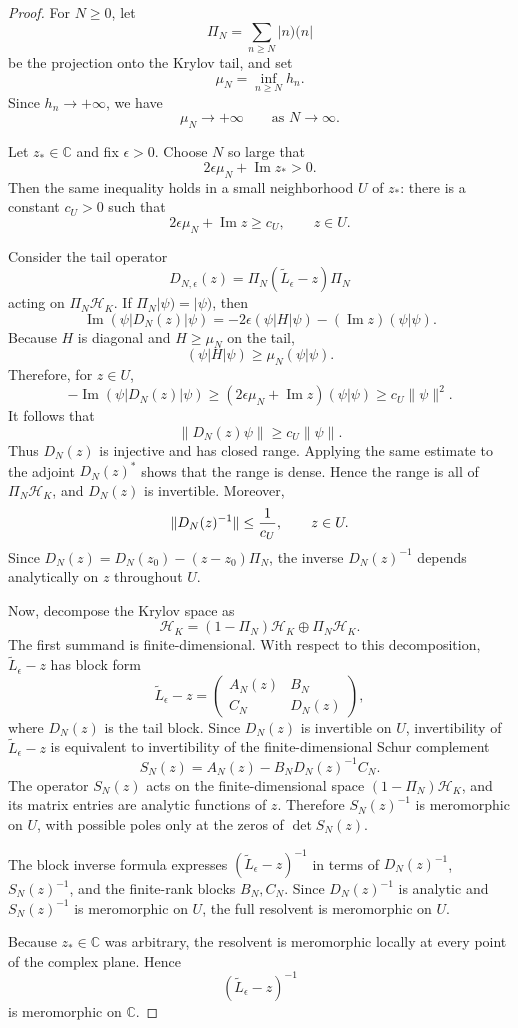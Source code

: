 \documentclass[JHEP,12pt]{article}
\begin{document}
\begin{proof}
For \(N\ge 0\), let
\[
\Pi_N=\sum_{n\ge N}|n)(n|
\]
be the projection onto the Krylov tail, and set
\[
\mu_N=\inf_{n\ge N}h_n .
\]
Since \(h_n\to+\infty\), we have
\[
\mu_N\longrightarrow+\infty
\qquad\text{as }N\to\infty .
\]

Let \(z_\ast\in\mathbb C\) and fix $\epsilon>0$. Choose \(N\) so large that
\[
2\epsilon\mu_N+\operatorname{Im}z_\ast>0 .
\]
Then the same inequality holds in a small neighborhood \(U\) of \(z_\ast\):
there is a constant \(c_U>0\) such that
\[
2\epsilon\mu_N+\operatorname{Im}z\ge c_U,
\qquad z\in U .
\]

Consider the tail operator
\[
D_{N,\epsilon}(z)=\Pi_N(\widetilde L_\epsilon-z)\Pi_N
\]
acting on \(\Pi_N\mathcal H_K\). If \(\Pi_N|\psi)=|\psi)\), then
\[
\operatorname{Im}(\psi|D_N(z)|\psi)
=
-2\epsilon(\psi|H|\psi)-(\operatorname{Im}z)(\psi|\psi).
\]
Because \(H\) is diagonal and \(H\ge \mu_N\) on the tail,
\[
(\psi|H|\psi)\ge \mu_N(\psi|\psi).
\]
Therefore, for \(z\in U\),
\[
-\operatorname{Im}(\psi|D_N(z)|\psi)
\ge
\left(2\epsilon\mu_N+\operatorname{Im}z\right)(\psi|\psi)
\ge
c_U\|\psi\|^2 .
\]
It follows that
\[
\|D_N(z)\psi\|\ge c_U\|\psi\| .
\]
Thus \(D_N(z)\) is injective and has closed range. Applying the same estimate to
the adjoint \(D_N(z)^*\) shows that the range is dense. Hence the range is all
of \(\Pi_N\mathcal H_K\), and \(D_N(z)\) is invertible. Moreover,
\[
\|D_N(z)^{-1}\|\le {1\over c_U},
\qquad z\in U .
\]
Since \(D_N(z)=D_N(z_0)-(z-z_0)\Pi_N\), the inverse \(D_N(z)^{-1}\) depends
analytically on \(z\) throughout \(U\).

Now, decompose the Krylov space as
\[
\mathcal H_K=(1-\Pi_N)\mathcal H_K\oplus \Pi_N\mathcal H_K .
\]
The first summand is finite-dimensional. With respect to this decomposition,
\(\widetilde L_\epsilon-z\) has block form
\[
\widetilde L_\epsilon-z
=
\begin{pmatrix}
A_N(z) & B_N \\
C_N & D_N(z)
\end{pmatrix},
\]
where \(D_N(z)\) is the tail block. Since \(D_N(z)\) is invertible on \(U\),
invertibility of \(\widetilde L_\epsilon-z\) is equivalent to invertibility of
the finite-dimensional Schur complement
\[
S_N(z)=A_N(z)-B_ND_N(z)^{-1}C_N .
\]
The operator \(S_N(z)\) acts on the finite-dimensional space
\((1-\Pi_N)\mathcal H_K\), and its matrix entries are analytic functions of
\(z\). Therefore \(S_N(z)^{-1}\) is meromorphic on \(U\), with possible poles
only at the zeros of \(\det S_N(z)\).

The block inverse formula expresses \((\widetilde L_\epsilon-z)^{-1}\) in terms
of \(D_N(z)^{-1}\), \(S_N(z)^{-1}\), and the finite-rank blocks \(B_N,C_N\).
Since \(D_N(z)^{-1}\) is analytic and \(S_N(z)^{-1}\) is meromorphic on \(U\),
the full resolvent is meromorphic on \(U\).

Because \(z_\ast\in\mathbb C\) was arbitrary, the resolvent is meromorphic
locally at every point of the complex plane. Hence
\[
(\widetilde L_\epsilon-z)^{-1}
\]
is meromorphic on \(\mathbb C\).
\end{proof}
\end{document}
